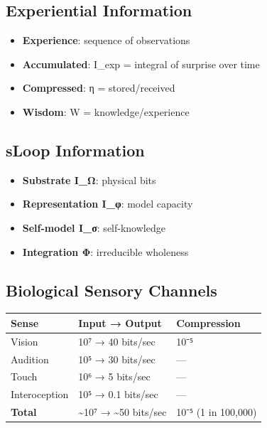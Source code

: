 \documentclass[
  11pt,
  letterpaper,
  twoside,
  openright]{book}
\providecommand{\tightlist}{%
  \setlength{\itemsep}{0pt}\setlength{\parskip}{0pt}}
\begin{document}
\subsection{Experiential Information}\label{experiential-information}

\begin{itemize}
\tightlist
\item
  \textbf{Experience}: sequence of observations
\item
  \textbf{Accumulated}: I\_exp = integral of surprise over time
\item
  \textbf{Compressed}: η = stored/received
\item
  \textbf{Wisdom}: W = knowledge/experience
\end{itemize}

\subsection{sLoop Information}\label{sloop-information}

\begin{itemize}
\tightlist
\item
  \textbf{Substrate I\_Ω}: physical bits
\item
  \textbf{Representation I\_φ}: model capacity
\item
  \textbf{Self-model I\_σ}: self-knowledge
\item
  \textbf{Integration Φ}: irreducible wholeness
\end{itemize}

\subsection{Biological Sensory
Channels}\label{biological-sensory-channels-1}

\begin{longtable}[]{@{}lll@{}}
\toprule\noalign{}
Sense & Input → Output & Compression \\
\midrule\noalign{}
\endhead
\bottomrule\noalign{}
\endlastfoot
Vision & 10⁷ → 40 bits/sec & 10⁻⁵ \\
Audition & 10⁵ → 30 bits/sec & --- \\
Touch & 10⁶ → 5 bits/sec & --- \\
Interoception & 10⁵ → 0.1 bits/sec & --- \\
\textbf{Total} & \textasciitilde10⁷ → \textasciitilde50 bits/sec & 10⁻⁵
(1 in 100,000) \\
\end{longtable}
\end{document}

